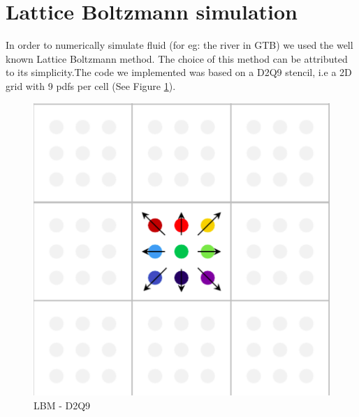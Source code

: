 \section{Lattice Boltzmann simulation}
In order to numerically simulate fluid (for eg: the river in GTB) we used the well known Lattice Boltzmann method. The choice
of this method can be attributed to its simplicity.The code we implemented was based on a D2Q9 stencil, i.e a 2D grid with 9 pdfs per cell (See Figure \ref{fig: D2Q9 push scheme}). 

	
\begin{figure}
\centering
\includegraphics[scale=0.4]{img/LBM/D2Q9_push}
\caption{LBM - D2Q9}
\label{fig: D2Q9 push scheme}
\end{figure}

